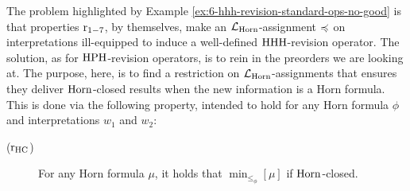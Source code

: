 The problem highlighted by Example \ref{ex:6-hhh-revision-standard-ops-no-good}
is that properties $\mathrm{r}_{1-7}$, by themselves,
make an $\mathcal{L}_{\mathrm{Horn}}$-assignment $\preccurlyeq$ on interpretations
ill-equipped to induce a well-defined ${\mathrm{HHH}}$-revision operator.
The solution, as for ${\mathrm{HPH}}$-revision operators, 
is to rein in the preorders we are looking at.
The purpose, here, is to find a restriction on 
$\mathcal{L}_{\mathrm{Horn}}$-assignments that ensures 
they deliver $\mathrm{Horn}$-closed results when the new information is 
a Horn formula.
This is done via the following property, intended to hold for 
any Horn formula $\phi$ and interpretations $w_1$ and $w_2$:

\begin{description}
	\item[($\mathrm{r}_{\mathrm{HC}}$)] For any Horn formula $\mu$, 
		it holds that $\min_{\le_{\phi}}[\mu]$ if $\mathrm{Horn}$-closed.
\end{description}




